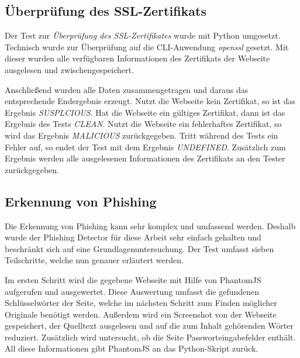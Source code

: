 \subsection{Überprüfung des SSL-Zertifikats}

Der Test zur \textit{Überprüfung des SSL-Zertifikates} wurde mit Python umgesetzt. Technisch wurde
zur Überprüfung auf die \ac{CLI}-Anwendung \textit{openssl} gesetzt. Mit dieser wurden alle verfügbaren Informationen des Zertifikats der Webseite ausgelesen und zwischengespeichert.

Anschließend wurden alle Daten zusammengetragen und daraus das entsprechende Endergebnis erzeugt.
Nutzt die Webseite kein Zertifikat, so ist das Ergebnis \textit{SUSPLCIOUS}. Hat die Webseite ein
gültiges Zertifikat, dann ist das Ergebnis des Tests \textit{CLEAN}. Nutzt die Webseite ein
fehlerhaftes Zertifikat, so wird das Ergebnis \textit{MALICIOUS} zurückgegeben. Tritt während des
Tests ein Fehler auf, so endet der Test mit dem Ergebnis \textit{UNDEFINED}. Zusätzlich
zum Ergebnis werden alle ausgelesenen Informationen des Zertifikats an den Tester zurückgegeben.

\subsection{Erkennung von Phishing}
\label{sec:umsetzung-phishungdetector}

Die Erkennung von Phishing kann sehr komplex und umfassend werden. Deshalb wurde der Phishing Detector für diese Arbeit sehr einfach gehalten und beschränkt sich auf eine Grundlagenuntersuchung. Der Test umfasst sieben Teilschritte, welche nun genauer erläutert werden.

Im ersten Schritt wird die gegebene Webseite mit Hilfe von PhantomJS aufgerufen und ausgewertet. Diese Auswertung umfasst die gefundenen Schlüsselwörter der Seite, welche im nächsten Schritt zum Finden möglicher Originale benötigt werden. Außerdem wird ein Screenshot von der Webseite gespeichert, der Quelltext ausgelesen und auf die zum Inhalt gehörenden Wörter reduziert. Zusätzlich wird untersucht, ob die Seite Passworteingabefelder enthält. All diese Informationen gibt PhantomJS an das Python-Skript zurück.

